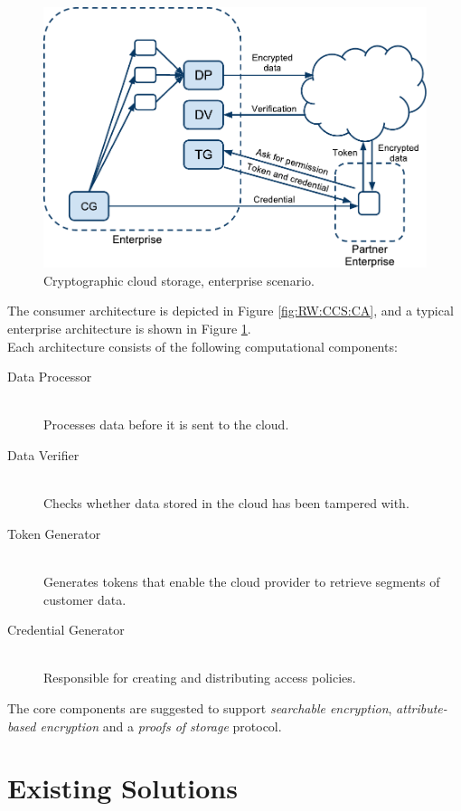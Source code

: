 \documentclass[pdftex,english,10pt,b5paper,twoside]{book}
\begin{document}
\begin{figure}[h!]
    \centering
    \includegraphics[scale=0.6]{ArchitectureCCSE.pdf}
    \caption{Cryptographic cloud storage, enterprise scenario.}
    \label{fig:RW:CCS:EA}
\end{figure}

The consumer architecture is depicted in Figure \ref{fig:RW:CCS:CA}, and a typical
enterprise architecture is shown in Figure \ref{fig:RW:CCS:EA}.\\

\noindent Each architecture consists of the following computational components:
\begin{description}
  \item[Data Processor] \hfill \\Processes data before it is sent to the cloud.
  \item[Data Verifier] \hfill \\Checks whether data stored in the cloud has been
  tampered with.
  \item[Token Generator] \hfill \\Generates tokens that enable the cloud provider to
  retrieve segments of customer data.
  \item[Credential Generator] \hfill \\Responsible for creating and distributing access
  policies.
\end{description}

The core components are suggested to support \emph{searchable encryption},
\emph{attribute-based encryption} and a \emph{proofs of storage} protocol.

\section{Existing Solutions}
\label{sec:existing}
\end{document}

